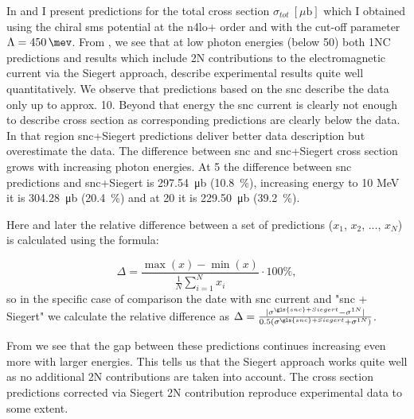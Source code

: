     In  and  
    I present predictions for the
    total cross section $\sigma_{tot}~[\mu\text{b}]$ which I obtained
    using the chiral \gls{sms} potential at the \gls{n4lo+} order and with 
    the cut-off parameter $\Lambda=\SI{450}{\mev}$.
    From , we see that at low photon energies
    (below \SI{50}{\mev})
    both 1NC predictions and results which include 2N contributions
    to the electromagnetic current
    via the Siegert approach, describe experimental results quite well quantitatively.
    We observe that predictions based on the \gls{snc} describe the data 
    only up to approx. \SI{10}{\mev}.
    Beyond that energy
    the \gls{snc} current is clearly not enough
    to describe cross section 
    as corresponding predictions are clearly below the data.
    In that region \gls{snc}+Siegert predictions deliver better data description but 
    overestimate the data.
    The difference between \gls{snc} and \gls{snc}+Siegert cross section grows with increasing photon energies.
    At \SI{5}{\mev} the difference between \gls{snc} predictions
    and \gls{snc}+Siegert is \SI{297.54}{\micro\barn} (\SI{10.8}{\percent}), increasing energy to 10 MeV
    it is \SI{304.28}{\micro\barn} (\SI{20.4}{\percent})
    and at \SI{20}{\mev} it is \SI{229.50}{\micro\barn} (\SI{39.2}{\percent}).
    
    Here and later the relative difference between a set of predictions ($x_1$, $x_2$, ..., $x_N$) is calculated
    using the formula:

    \begin{equation}
        \Delta = \frac{\max(x) - \min(x)}{\frac{1}{N}\sum_{i=1}^N x_i} \cdot 100\%,
        \label{eq:relative_diff}
    \end{equation}
    so in the specific case of comparison the date with \gls{snc} current and "\gls{snc} + Siegert" we
    calculate the relative difference as 
    $\Delta = \frac{|\sigma^{\gls{snc}+Siegert} - \sigma^{1N}|}{0.5(\sigma^{\gls{snc}+Siegert} + \sigma^{1N})}$.
    
    From  we see that the gap between these predictions
    continues increasing even more with larger energies.
    This tells us that the Siegert approach works quite well as no additional 2N contributions are taken into account.
    The cross section predictions corrected via Siegert 2N contribution reproduce 
    experimental data to some extent.
    
